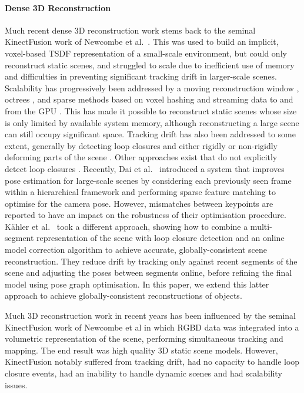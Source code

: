 \paragraph{Dense 3D Reconstruction}

Much recent dense 3D reconstruction work stems back to the seminal KinectFusion work of Newcombe et al.\ \cite{Newcombe2011}. This was used to build an implicit, voxel-based TSDF representation \cite{Curless1996} of a small-scale environment, but could only reconstruct static scenes, and struggled to scale due to inefficient use of memory and difficulties in preventing significant tracking drift in larger-scale scenes. Scalability has progressively been addressed by a moving reconstruction window \cite{Roth2012,Whelan2012}, octrees \cite{Zeng2012}, and sparse methods based on voxel hashing and streaming data to and from the GPU \cite{Niessner2013,Prisacariu2014}. This has made it possible to reconstruct static scenes whose size is only limited by available system memory, although reconstructing a large scene can still occupy significant space. Tracking drift has also been addressed to some extent, generally by detecting loop closures and either rigidly or non-rigidly deforming parts of the scene \cite{Zhou2013,Whelan2015IJRR,Whelan2015RSS}. Other approaches exist that do not explicitly detect loop closures \cite{Fioraio2015}. Recently, Dai et al.\ \cite{dai2016bundlefusion} introduced a system that improves pose estimation for large-scale scenes by considering each previously seen frame within a hierarchical framework and performing sparse feature matching to optimise for the camera pose. However, mismatches between keypoints are reported to have an impact on the robustness of their optimisation procedure. K{\"a}hler et al.\ \cite{Kahler2016} took a different approach, showing how to combine a multi-segment representation of the scene with loop closure detection and an online model correction algorithm to achieve accurate, globally-consistent scene reconstruction. They reduce drift by tracking only against recent segments of the scene and adjusting the poses between segments online, before refining the final model using pose graph optimisation. In this paper, we extend this latter approach to achieve globally-consistent reconstructions of objects.


\iffalse
Much 3D reconstruction work in recent years has been influenced by the seminal KinectFusion work \cite{Newcombe2011} of Newcombe et al in which
RGBD data was integrated into a volumetric representation of the scene, performing simultaneous tracking and mapping. The end result was
high quality 3D static scene models. 
However, KinectFusion notably suffered from tracking drift, had no capacity to handle loop closure events, had an inability to handle dynamic scenes 
and had scalability issues.

